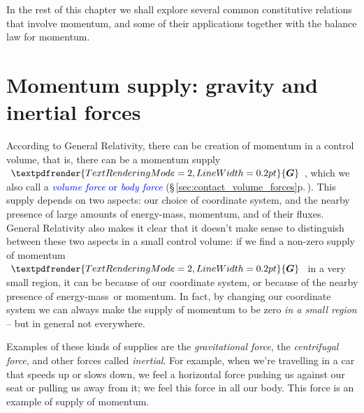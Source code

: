 \documentclass[a4paper,12pt,%
onecolumn,oneside,%
british%
]{memoir}
\renewcommand*{\bm}[1]{\textpdfrender{TextRenderingMode=2,LineWidth=0.2pt}{\boldsymbol{#1}}}
\renewcommand*{\|}[1][]{\nonscript\:#1\vert\nonscript\:\mathopen{}}
\newcommand*{\sect}{\S}%
\renewcommand*{\autoref}[3][\sect\,\ref]{\textcolor{blue}{#3} {\color{blue}\scriptsize(\faIcon[regular]{eye}\;#1{#2}\;p.\,\pageref{#2})}}
\newcommand*{\energym}{energy-mass}
\newcommand*{\yG}{\bm{G}}
\begin{document}
\medskip

In the rest of this chapter we shall explore several common constitutive relations that involve momentum, and some of their applications together with the balance law for momentum.

\section{Momentum supply: gravity and inertial forces}
\label{sec:gravity}

According to General Relativity, there can be creation of momentum in a control volume, that is, there can be a momentum supply $\yG$, which we also call a \autoref{sec:contact_volume_forces}{\emph{volume force} or \emph{body force}}. This supply depends on two aspects: our choice of coordinate system, and the nearby presence of large amounts of \energym, momentum, and of their fluxes. General Relativity also makes it clear that it doesn't make sense to distinguish between these two aspects in a small control volume: if we find a non-zero supply of momentum $\yG$ in a very small region, it can be because of our coordinate system, or because of the nearby presence of \energym\ or momentum. In fact, by changing our coordinate system we can always make the supply of momentum to be zero \emph{in a small region} -- but in general not everywhere.

%
%
Examples of these kinds of supplies are the \emph{gravitational force}, the \emph{centrifugal force}, and other forces called \emph{inertial}. For example, when we're travelling in a car that speeds up or slows down, we feel a horizontal force pushing us against our seat or pulling us away from it; we feel this force in all our body. This force is an example of supply of momentum.
\end{document}
